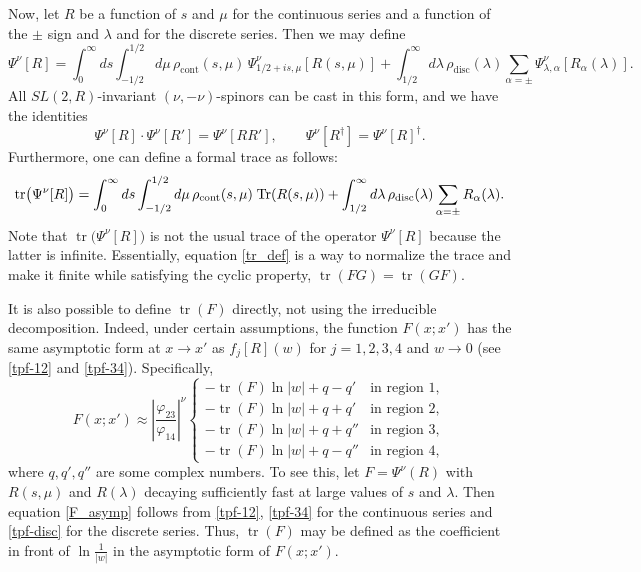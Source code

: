 \documentclass[11pt]{article}
\newcommand{\vp}{\varphi}
\newcommand{\RR}{\mathbb{R}}
\DeclareMathOperator{\tr}{tr}
\DeclareMathOperator{\Tr}{Tr}
\DeclareMathOperator{\SL}{SL}
\newcommand{\rcont}{\rho_{\text{cont}}}
\newcommand{\rdisc}{\rho_{\text{disc}}}
\def\widetilde#1{#1}%
\def\SL{SL}
\def\RR{R}
\begin{document}
Now, let $R$ be a function of $s$ and $\mu$ for the continuous series and a function of the $\pm$ sign and $\lambda$ and for the discrete series. Then we may define
\begin{equation} \label{genop}
\Psi^{\nu}[R]=\int_{0}^{\infty}ds \int_{-1/2}^{1/2}d\mu\,\rcont(s,\mu)\,
\Psi^{\nu}_{1/2+is,\mu}[R(s,\mu)]
+\int_{1/2}^{\infty}d\lambda\,\rdisc(\lambda) \sum_{\alpha=\pm}
\Psi^{\nu}_{\lambda,\alpha}[R_{\alpha}(\lambda)].
\end{equation}
All $\widetilde{\SL}(2,\RR)$-invariant $(\nu,-\nu)$-spinors can be cast in this form, and we have the identities
\begin{equation}
\Psi^{\nu}[R]\cdot\Psi^{\nu}[R']=\Psi^{\nu}[RR'],\qquad
\Psi^{\nu}[R^{\dag}]=\Psi^{\nu}[R]^{\dag}.
\end{equation}
Furthermore, one can define a formal trace as follows:
\begin{equation}\label{tr_def}
\tr\bigl(\Psi^{\nu}[R]\bigr)
=\int_{0}^{\infty}ds \int_{-1/2}^{1/2}d\mu\,\rcont(s,\mu)\kern1pt
\Tr(R(s,\mu))
+\int_{1/2}^{\infty}d\lambda\,\rdisc(\lambda)\sum_{\alpha=\pm}
R_{\alpha}(\lambda).
\end{equation}
Note that $\tr\bigl(\Psi^{\nu}[R]\bigr)$ is not the usual trace of the operator $\Psi^{\nu}[R]$ because the latter is infinite. Essentially, equation \eqref{tr_def} is a way to normalize the trace and make it finite while satisfying the cyclic property, $\tr(FG)=\tr(GF)$.

It is also possible to define $\tr(F)$ directly, not using the irreducible decomposition. Indeed, under certain assumptions, the function $F(x;x')$ has the same asymptotic form at $x\to x'$ as $f_j[R](w)$ for $j=1,2,3,4$ and $w\to 0$ (see \eqref{tpf-12} and \eqref{tpf-34}). Specifically,
\begin{equation}\label{F_asymp}
F(x;x')\approx\left|\frac{\vp_{23}}{\vp_{14}}\right|^{\nu}\begin{cases}
-\tr(F)\ln|w|+q-q' & \text{in region }1,\\
-\tr(F)\ln|w|+q+q' & \text{in region }2,\\
-\tr(F)\ln|w|+q+q'' & \text{in region }3,\\
-\tr(F)\ln|w|+q-q'' & \text{in region }4,
\end{cases}
\end{equation}
where $q,q',q''$ are some complex numbers. To see this, let $F=\Psi^{\nu}(R)$ with $R(s,\mu)$ and $R(\lambda)$ decaying sufficiently fast at large values of $s$ and $\lambda$. Then equation \eqref{F_asymp} follows from \eqref{tpf-12}, \eqref{tpf-34} for the continuous series and \eqref{tpf-disc} for the discrete series. Thus, $\tr(F)$ may be defined as the coefficient in front of $\ln\frac{1}{|w|}$ in the asymptotic form of $F(x;x')$.
\end{document}
